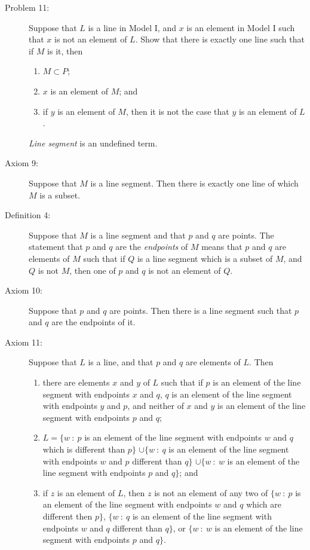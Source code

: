 \documentclass{article}
\begin{document}
\begin{description}
  \item[Problem 11:] Suppose that $L$ is a line in Model I, and $x$ is an element in Model I such that $x$ is not an element of $L$. Show that there is exactly one line such that if $M$ is it, then
    \begin{enumerate}[\hspace{1cm}(i.)]
      \item $M \subset P$;
      \item $x$ is an element of $M$; and
      \item if $y$ is an element of $M$, then it is not the case that $y$ is an element of $L$.
    \end{enumerate}

  \item[] \emph{Line segment} is an undefined term.

  \item[Axiom 9:] Suppose that $M$ is a line segment. Then there is exactly one line of which $M$ is a subset.

  \item[Definition 4:] Suppose that $M$ is a line segment and that $p$ and $q$ are points. The statement that $p$ and $q$ are the \emph{endpoints} of $M$ means that $p$ and $q$ are elements of $M$ such that if $Q$ is a line segment which is a subset of $M$, and $Q$ is not $M$, then one of $p$ and $q$ is not an element of $Q$.

  \item[Axiom 10:] Suppose that $p$ and $q$ are points. Then there is a line segment such that $p$ and $q$ are the endpoints of it.

  \item[Axiom 11:] Suppose that $L$ is a line, and that $p$ and $q$ are elements of $L$. Then
    \begin{enumerate}[\hspace{1cm}(i.)]
      \item there are elements $x$ and $y$ of $L$ such that if $p$ is an element of the line segment with endpoints $x$ and $q$, $q$ is an element of the line segment with endpoints $y$ and $p$, and neither of $x$ and $y$ is an element of the line segment with endpoints $p$ and $q$;
      \item $L = \{ w\ :\ p$ is an element of the line segment with endpoints $w$ and $q$ which is different than $p \}$ $\cup \{ w\ :\ q$ is an element of the line segment with endpoints $w$ and $p$ different than $q \}$ $\cup \{ w\ :\ w$ is an element of the line segment with endpoints $p$ and $q \}$; and
      \item if $z$ is an element of $L$, then $z$ is not an element of any two of $\{ w\ :\ p$ is an element of the line segment with endpoints $w$ and $q$ which are different then $p \}$, $\{ w\ :\ q$ is an element of the line segment with endpoints $w$ and $q$ different than $q \}$, or $\{ w\ :\ w$ is an element of the line segment with endpoints $p$ and $q \}$.
    \end{enumerate}


\end{description}
\end{document}
